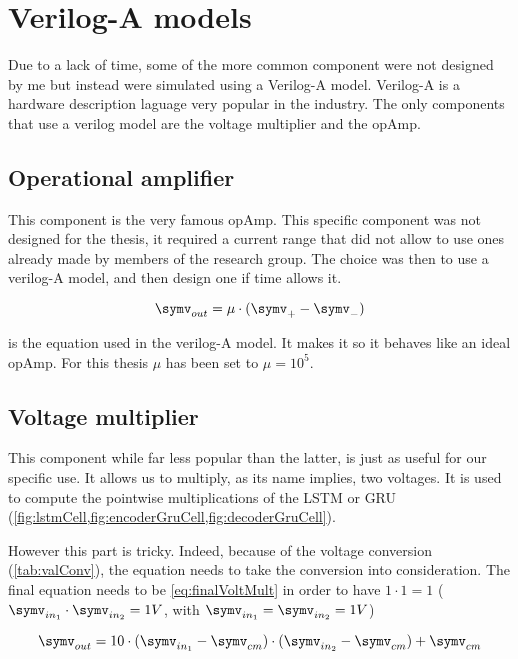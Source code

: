 \section{Verilog-A models}
\label{sec:models}

Due to a lack of time, some of the more common component were not designed by me but instead were simulated using a Verilog-A model. Verilog-A is a hardware description laguage very popular in the industry. The only components that use a verilog model are the voltage multiplier and the \ac{opAmp}.

\subsection{Operational amplifier}\label{subsec:opamp}

This component is the very famous \ac{opAmp}. This specific component was not designed for the thesis, it required a current range that did not allow to use ones already made by members of the research group. The choice was then to use a verilog-A model, and then design one if time allows it.

\begin{equation}
  \label{eq:opAmp}
  \symv_{out}=\mu \cdot (\symv_+-\symv_-)
\end{equation}

 is the equation used in the verilog-A model. It makes it so it behaves like an ideal \ac{opAmp}. For this thesis $\mu$ has been set to $\mu=10^5$.

\subsection{Voltage multiplier}\label{subsec:voltmult}

This component while far less popular than the latter, is just as useful for our specific use. It allows us to multiply, as its name implies, two voltages. It is used to compute the pointwise multiplications of the \ac{LSTM} or \ac{GRU} (\cref{fig:lstmCell,fig:encoderGruCell,fig:decoderGruCell}).

However this part is tricky. Indeed, because of the voltage conversion (\cref{tab:valConv}), the equation needs to take the conversion into consideration. The final equation needs to be \cref{eq:finalVoltMult} in order to have $1\cdot 1=1$ ($\symv_{in_1}\cdot \symv_{in_2}=1V$, with $\symv_{in_1}=\symv_{in_2}=1V$)

\begin{equation}\label{eq:finalVoltMult}
  \symv_{out}=10\cdot(\symv_{in_1}-\symv_{cm})\cdot (\symv_{in_2}-\symv_{cm}) + \symv_{cm}
\end{equation}

